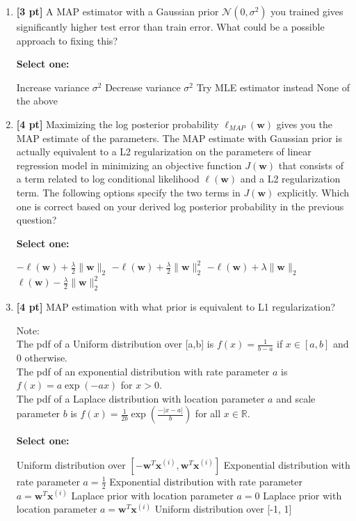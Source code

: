 \documentclass[11pt,addpoints,answers]{exam}
\begin{document}
\begin{enumerate}
    \item \textbf{[3 pt]} A MAP estimator with a Gaussian prior $\mathcal{N}(0, \sigma^2)$ you trained gives significantly higher test error than train error. What could be a possible approach to fixing this? 

    \textbf{Select one:}
    \begin{checkboxes}
        \choice Increase variance $\sigma^2$
        \choice Decrease variance $\sigma^2$
        \choice Try MLE estimator instead
        \choice None of the above
    \end{checkboxes}
    
    
    \item \textbf{[4 pt]} Maximizing the log posterior probability  $\ell_{\textit{MAP}}(\mathbf{w})$ gives you the MAP estimate of the parameters. The MAP estimate with Gaussian prior is actually equivalent to a L2 regularization on the parameters of linear regression model in minimizing an objective function $J(\mathbf{w})$ that consists of a term related to log conditional likelihood $\ell(\mathbf{w})$ and a L2 regularization term. The following options specify the two terms in $J(\mathbf{w})$ explicitly. Which one is correct based on your derived log posterior probability in the previous question? 

    \textbf{Select one:}
    \begin{checkboxes}
        \choice $- \ell(\mathbf{w}) + \frac{\lambda}{2}\|\mathbf{w}\|_2$
        \choice $- \ell(\mathbf{w}) + \frac{\lambda}{2}\|\mathbf{w}\|_2^2$
        \choice $- \ell(\mathbf{w}) + \lambda\|\mathbf{w}\|_2$
        \choice $\ell(\mathbf{w}) - \frac{\lambda}{2}\|\mathbf{w}\|_2^2$
    \end{checkboxes}
    
    
    \item \textbf{[4 pt]} MAP estimation with what prior is equivalent to L1 regularization? 

    Note:\\
    The pdf of a Uniform distribution over [a,b] is $f(x) = \frac{1}{b-a}$ if $x \in [a,b]$ and 0 otherwise.\\
    The pdf of an exponential distribution with rate parameter $a$ is $f(x) = a \exp(-a x)$ for $x > 0$.\\
    The pdf of a Laplace distribution with location parameter $a$ and scale parameter $b$  is $f(x) = \frac{1}{2b} \exp \left( \frac{- |x - a| }{b} \right)$ for all $x \in \mathbb{R}$.
    

    \textbf{Select one:}
    \begin{checkboxes}
        \choice Uniform distribution over $[- \mathbf{w}^T\mathbf{x}^{(i)}, \mathbf{w}^T\mathbf{x}^{(i)} ]$
        \choice Exponential distribution with rate parameter $a = \frac{1}{2}$
        \choice Exponential distribution with rate parameter $a = \mathbf{w}^T \mathbf{x}^{(i)}$
        \choice Laplace prior with location parameter $a = 0$
        \choice Laplace prior with location parameter $a = \mathbf{w}^T \mathbf{x}^{(i)}$
        \choice Uniform distribution over [-1, 1]
    \end{checkboxes}
    
\end{enumerate}
\clearpage
\end{document}
